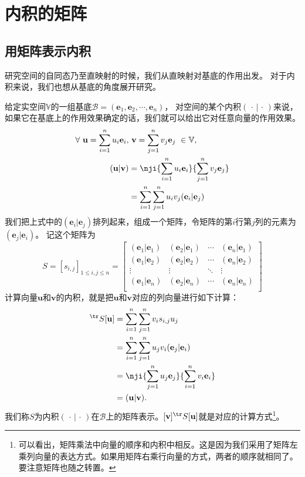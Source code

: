 \documentclass[12pt,UTF8]{ctexbook}
\begin{document}
\section{内积的矩阵}
\subsection{用矩阵表示内积}
研究空间的自同态乃至直映射的时候，我们从直映射对基底的作用出发。
对于内积来说，我们也想从基底的角度展开研究。

给定实空间$\mathbb{V}$的一组基底$ \mathcal{B} = (\mathbf{e}_1, \mathbf{e}_2, \cdots , \mathbf{e}_n )$，
对空间的某个内积$(\,\cdot \,|\, \cdot\,)$来说，如果它在基底上的作用效果确定的话，我们就可以给出它对任意向量的作用效果。
\begin{align*}
    \forall \,\, \mathbf{u} = \sum_{i=1}^n u_i \mathbf{e}_i , & \,\,\mathbf{v} = \sum_{j=1}^n v_j \mathbf{e}_j  \,\,\in \mathbb{V},  \\
    ( \mathbf{u} |  \mathbf{v} ) &= \nji{\sum_{i=1}^n u_i \mathbf{e}_i}{\sum_{j=1}^n v_j \mathbf{e}_j}  \\
    &= \sum_{i=1}^n \sum_{j=1}^n u_i v_j (\mathbf{e}_i|\mathbf{e}_j) 
\end{align*}
我们把上式中的$(\mathbf{e}_i|\mathbf{e}_j)$排列起来，组成一个矩阵，令矩阵的第$i$行第$j$列的元素为$(\mathbf{e}_j|\mathbf{e}_i)$。
记这个矩阵为
$$
S = [s_{i,j}]_{1 \leqslant i, j \leqslant n} = \begin{bmatrix}
    (\mathbf{e}_1|\mathbf{e}_1) & (\mathbf{e}_2|\mathbf{e}_1) & \cdots & (\mathbf{e}_n|\mathbf{e}_1) \\
    (\mathbf{e}_1|\mathbf{e}_2) & (\mathbf{e}_2|\mathbf{e}_2) & \cdots & (\mathbf{e}_n|\mathbf{e}_2) \\
    \vdots & \vdots & \ddots & \vdots \\
    (\mathbf{e}_1|\mathbf{e}_n) & (\mathbf{e}_2|\mathbf{e}_n) & \cdots & (\mathbf{e}_n|\mathbf{e}_n) \\
\end{bmatrix}
$$
计算向量$\mathbf{u}$和$\mathbf{v}$的内积，就是把$\mathbf{u}$和$\mathbf{v}$对应的列向量进行如下计算：
\begin{align*}
    [\mathbf{v}]^{\tr} S [\mathbf{u}] &= \sum_{i=1}^n \sum_{j=1}^n v_i s_{i,j} u_j   \\
    &= \sum_{i=1}^n \sum_{j=1}^n u_j v_i (\mathbf{e}_j |\mathbf{e}_i )  \\
    &= \nji{\sum_{j=1}^n u_j \mathbf{e}_j}{\sum_{i=1}^n v_i \mathbf{e}_i}  \\
    &= ( \mathbf{u}  | \mathbf{v}  ). 
\end{align*}
我们称$S$为内积$(\,\cdot \,|\, \cdot\,)$在$\mathcal{B}$上的矩阵表示。$[\mathbf{v}]^{\tr} S [\mathbf{u}]$就是对应的计算方式\footnote{可以看出，矩阵乘法中向量的顺序和内积中相反。这是因为我们采用了矩阵左乘列向量的表达方式。如果用矩阵右乘行向量的方式，两者的顺序就相同了。要注意矩阵也随之转置。}。
\end{document}

